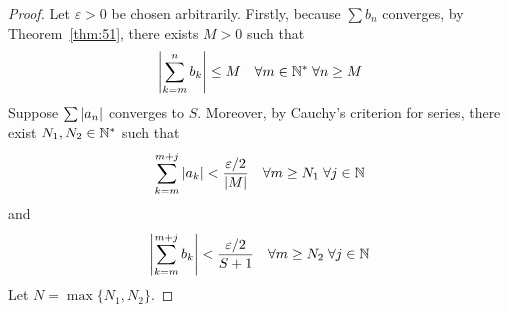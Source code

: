 \documentclass[thmcnt=section, 12pt]{my-elegantbook}
\begin{document}
\begin{proof}
    Let $\varepsilon > 0$ be chosen arbitrarily. Firstly, because $\sum b_n$ converges, by Theorem~\ref{thm:51}, there exists $M > 0$ such that
    \begin{align}
        \left\lvert \sum_{k=m}^n b_k \right\rvert \leq M
        \quad \forall m \in \mathbb{N}^\ast \;
        \forall n \geq M
        \label{eq:112}
    \end{align}
    Suppose $\sum \left\lvert a_n \right\rvert$ converges to $S$. Moreover, by Cauchy's criterion for series, there exist $N_1, N_2 \in \mathbb{N}^\ast$ such that
    \begin{align}
        \sum_{k=m}^{m+j} \left\lvert a_k \right\rvert
        < \frac{\varepsilon / 2}{\left\lvert M \right\rvert}
        \quad
        \forall m \geq N_1 \;
        \forall j \in \mathbb{N}
        \label{eq:110}
    \end{align}
    and
    \begin{align}
        \left\lvert \sum_{k=m}^{m+j} b_k \right\rvert
        < \frac{\varepsilon / 2}{S + 1}
        \quad
        \forall m \geq N_2 \;
        \forall j \in \mathbb{N}
        \label{eq:111}
    \end{align}
    Let $N = \max \{N_1, N_2\}$.


\end{proof}
\end{document}
